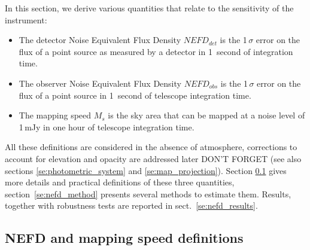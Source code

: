 
%

In this section, we derive various quantities that relate to the
sensitivity of the instrument:

\begin{itemize}
\item The detector Noise Equivalent Flux Density $NEFD_{det}$ is the 1\,$\sigma$
  error on the flux of a point source as measured by a detector in 1~second of
  integration time.
\item The observer Noise Equivalent Flux Density $NEFD_{obs}$ is the 1\,$\sigma$
  error on the flux of a point source in 1~second of telescope integration time.
\item The mapping speed $M_s$ is the sky area that can be mapped at a noise
  level of 1\,mJy in one hour of telescope integration time.
\end{itemize}

All these definitions are considered in the absence of atmosphere, corrections
to account for elevation and opacity are {\color{red} addressed later DON'T
  FORGET} (see also sections \ref{se:photometric_system} and
\ref{se:map_projection}). Section \ref{se:integration_time} gives more details
and practical definitions of these three quantities,
section~\ref{se:nefd_method} presents several methods to estimate them. Results,
together with robustness tests are reported in sect.~\ref{se:nefd_results}.

\subsection{NEFD and mapping speed definitions}
\label{se:integration_time}



